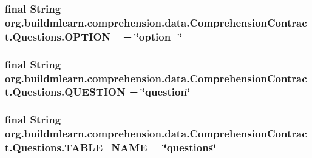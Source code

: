 \subsubsection[{\texorpdfstring{O\+P\+T\+I\+O\+N\+\_\+4}{OPTION_4}}]{\setlength{\rightskip}{0pt plus 5cm}final String org.\+buildmlearn.\+comprehension.\+data.\+Comprehension\+Contract.\+Questions.\+O\+P\+T\+I\+O\+N\+\_ = \char`\"{}option\+\_\char`\"{}\hspace{0.3cm}{\ttfamily [static]}}\hypertarget{classorg_1_1buildmlearn_1_1comprehension_1_1data_1_1ComprehensionContract_1_1Questions_aa59c3e37d3778affdf27f565c1c8df8a}{}\label{classorg_1_1buildmlearn_1_1comprehension_1_1data_1_1ComprehensionContract_1_1Questions_aa59c3e37d3778affdf27f565c1c8df8a}
\subsubsection[{\texorpdfstring{Q\+U\+E\+S\+T\+I\+ON}{QUESTION}}]{\setlength{\rightskip}{0pt plus 5cm}final String org.\+buildmlearn.\+comprehension.\+data.\+Comprehension\+Contract.\+Questions.\+Q\+U\+E\+S\+T\+I\+ON = \char`\"{}question\char`\"{}\hspace{0.3cm}{\ttfamily [static]}}\hypertarget{classorg_1_1buildmlearn_1_1comprehension_1_1data_1_1ComprehensionContract_1_1Questions_a3c6f33bce6ee27cd82554197fcdada51}{}\label{classorg_1_1buildmlearn_1_1comprehension_1_1data_1_1ComprehensionContract_1_1Questions_a3c6f33bce6ee27cd82554197fcdada51}
\subsubsection[{\texorpdfstring{T\+A\+B\+L\+E\+\_\+\+N\+A\+ME}{TABLE_NAME}}]{\setlength{\rightskip}{0pt plus 5cm}final String org.\+buildmlearn.\+comprehension.\+data.\+Comprehension\+Contract.\+Questions.\+T\+A\+B\+L\+E\+\_\+\+N\+A\+ME = \char`\"{}questions\char`\"{}\hspace{0.3cm}{\ttfamily [static]}}\hypertarget{classorg_1_1buildmlearn_1_1comprehension_1_1data_1_1ComprehensionContract_1_1Questions_a68c42a8c64d9eb1b5b0425bd8ba636c5}{}\label{classorg_1_1buildmlearn_1_1comprehension_1_1data_1_1ComprehensionContract_1_1Questions_a68c42a8c64d9eb1b5b0425bd8ba636c5}


